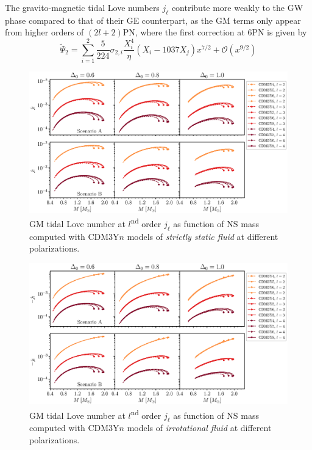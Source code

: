 The gravito-magnetic tidal Love numbers $j_\ell$ contribute more weakly to the \gls{GW} phase compared to that of their \gls{GE} counterpart, as the \gls{GM} terms only appear from higher orders of $(2l+2)$PN, where the first correction at 6PN is given by \citep{perot2021role,yagi2017erratum}
\begin{equation}
    \tilde{\Psi}_2 = \sum^{2}_{i=1} \frac{5}{224} \sigma_{2,i} \frac{X_i^4}{\eta} \left( X_i - 1037X_j \right)x^{7/2} + \mathcal{O}(x^{9/2})
\end{equation}
\begin{figure}[ht!]
        \centering
        \includegraphics[width=\textwidth]{fig/jl_stat.eps}
        \caption{\gls{GM} tidal Love number at $l$\textsuperscript{nd} order $j_\ell$ as function of \gls{NS} mass computed with CDM3Y$n$ models of \emph{strictly static fluid} at different polarizations.}
        \label{fig:jl_stat}
\end{figure} 
\begin{figure}[ht!]
        \centering
        \includegraphics[width=\textwidth]{fig/jl_irrot.eps}
        \caption{\gls{GM} tidal Love number at $l$\textsuperscript{nd} order $j_\ell$ as function of \gls{NS} mass computed with CDM3Y$n$ models of \emph{irrotational fluid} at different polarizations.}
        \label{fig:jl_irrot}
\end{figure} 
